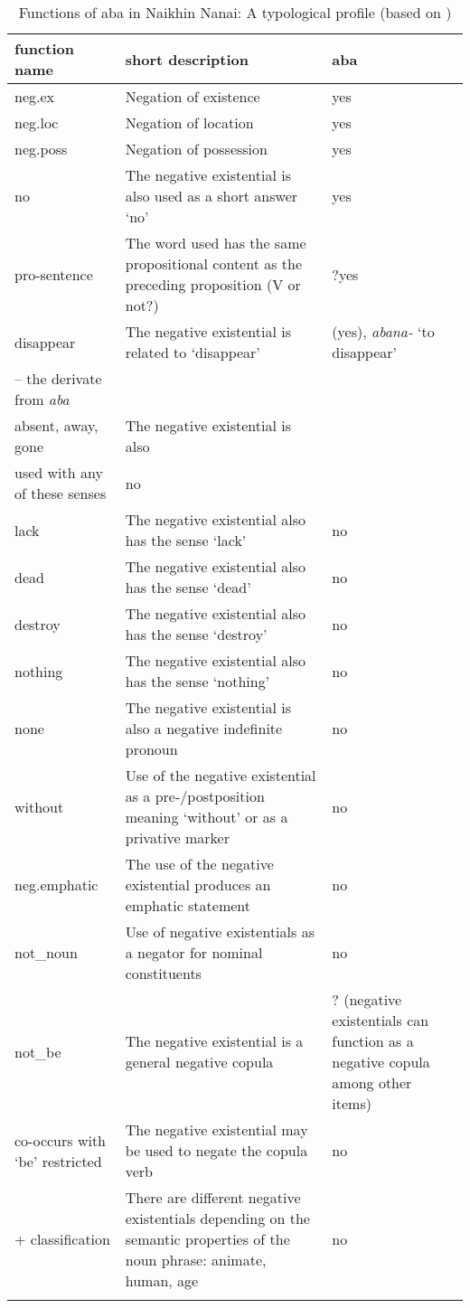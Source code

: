 \documentclass[output=paper]{langscibook}
\begin{document}
\begin{table}[]
\small
    \caption{Functions of aba in Naikhin Nanai: A typological profile (based on \citealp[118--119]{Veselinova2013})}
    \label{tab:T3}
    \begin{tabularx}{\textwidth}{p{3cm}Qp{2cm}}
        \lsptoprule
        function name & short description & aba \\
        \midrule
        neg.ex & Negation of existence & yes \\
        neg.loc & Negation of location & yes \\
        neg.poss & Negation of possession & yes \\
        no & The negative existential is also used as a short answer ‘no’ & yes \\
        pro-sentence & The word used has the same propositional content as the preceding proposition (V or not?) & ?yes \\
        disappear & The negative existential is related to ‘disappear’ & (yes), \textit{abana-} ‘to disappear’\\ – the derivate from \textit{aba} \\
        absent, away, gone & The negative existential is also\\ used with any of these senses & no \\
        lack & The negative existential also has the sense ‘lack’ & no \\
        dead & The negative existential also has the sense ‘dead’ & no \\
        destroy & The negative existential also has the sense ‘destroy’ & no \\
        nothing & The negative existential also has the sense ‘nothing’ & no \\
        none & The negative existential is also a negative indefinite pronoun & no \\
        without & Use of the negative existential as a pre-/postposition meaning ‘without’ or as a privative marker & no \\
        neg.emphatic & The use of the negative existential produces an emphatic statement & no \\
        not\_noun & Use of negative existentials as a negator for nominal constituents & no \\
        not\_be & The negative existential is a general negative copula & ? (negative existentials can function as a negative copula among other items) \\
        co-occurs with ‘be’ restricted & The negative existential may be used to negate the copula verb & no \\
        + classification & There are different negative existentials depending on the semantic properties of the noun phrase: animate, human, age & no \\ \lspbottomrule
    \end{tabularx}
    \end{table}
\end{document}
